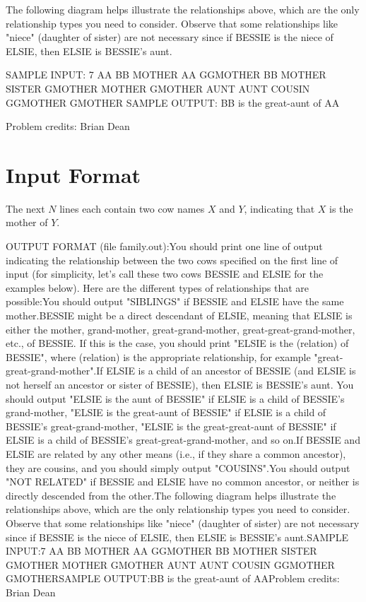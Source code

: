 \documentclass[12pt]{article}
\begin{document}
The following diagram helps illustrate the relationships above, which are the
only relationship types you need to consider.  Observe that 
some relationships like "niece" (daughter of sister) are not necessary since if
BESSIE is the niece of ELSIE, then ELSIE is BESSIE's aunt.


SAMPLE INPUT:
7 AA BB
MOTHER AA
GGMOTHER BB
MOTHER SISTER
GMOTHER MOTHER
GMOTHER AUNT
AUNT COUSIN
GGMOTHER GMOTHER
SAMPLE OUTPUT: 
BB is the great-aunt of AA


Problem credits: Brian Dean



\section*{Input Format}
The next $N$ lines each contain two cow names $X$ and $Y$, indicating that $X$
is the mother of $Y$.

OUTPUT FORMAT (file family.out):You should print one line of output indicating the relationship between the two
cows specified on the first line of input (for simplicity, let's call these two
cows BESSIE and ELSIE for the examples below).  Here are the different types of
relationships that are possible:You should output "SIBLINGS" if BESSIE and ELSIE have the same mother.BESSIE might be a direct descendant of ELSIE, meaning that ELSIE is either
the mother, grand-mother, great-grand-mother, great-great-grand-mother, etc., of
BESSIE. If this is the case, you should print "ELSIE is the (relation) of
BESSIE", where (relation) is the appropriate relationship, for example
"great-great-grand-mother".If ELSIE is a child of an ancestor of
BESSIE (and ELSIE is not herself an ancestor or sister of BESSIE), then ELSIE is BESSIE's aunt.
You should output "ELSIE is the aunt of
BESSIE" if ELSIE is a child of BESSIE's grand-mother, "ELSIE is the great-aunt
of BESSIE" if ELSIE is a child of BESSIE's great-grand-mother, "ELSIE is the
great-great-aunt of BESSIE" if ELSIE is a child of BESSIE's
great-great-grand-mother, and so on.If BESSIE and ELSIE are related by
any other means (i.e., if they share a common ancestor), they are cousins, and
you should simply output "COUSINS".You should output "NOT RELATED" if
BESSIE and ELSIE have no common ancestor, or neither is directly descended from
the other.The following diagram helps illustrate the relationships above, which are the
only relationship types you need to consider.  Observe that 
some relationships like "niece" (daughter of sister) are not necessary since if
BESSIE is the niece of ELSIE, then ELSIE is BESSIE's aunt.SAMPLE INPUT:7 AA BB
MOTHER AA
GGMOTHER BB
MOTHER SISTER
GMOTHER MOTHER
GMOTHER AUNT
AUNT COUSIN
GGMOTHER GMOTHERSAMPLE OUTPUT:BB is the great-aunt of AAProblem credits: Brian Dean
\end{document}
